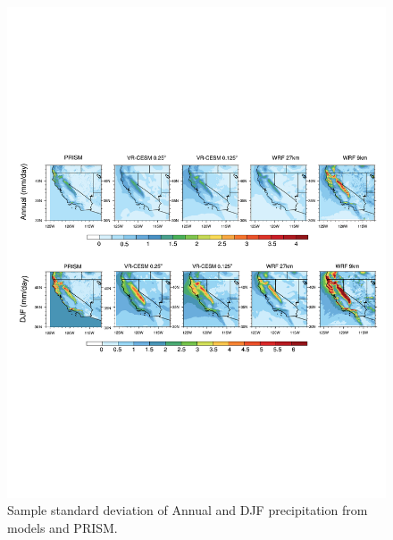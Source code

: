 \begin{figure}
\begin{center}
\includegraphics[width=6in]{pr_DJF_Annual_std.pdf}
\end{center}
\caption{Sample standard deviation of Annual and DJF precipitation from models and PRISM.} \label{fig:Figure 10}
\end{figure}

